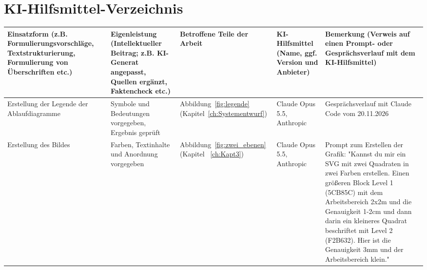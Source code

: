 \documentclass[
	thesis={type=msc}, %
	class=report,%
	ruledheaders=section,%
	accentcolor=1b, %
	marginpar=false,%
	parskip=half-,%
	fontsize=11pt,%
	IMRAD=false, %
]{tudapub}
\begin{document}




%



\cleardoublepage
\ifdocenglish
    \printbibliography[title={Bibliography}]
\else
    \printbibliography[title={Literaturverzeichnis}]
\fi
\cleardoublepage

\chapter*{KI-Hilfsmittel-Verzeichnis}


\begin{longtable}{|p{}|p{}|p{}|p{}|p{}|}
\hline
\rowcolor[HTML]{C0C0C0} 
{\color[HTML]{DEDEDE} } \textbf{Einsatzform} \; (z.B. Formulierungsvorschläge, Textstrukturierung, Formulierung von Überschriften etc.) & {\color[HTML]{DEDEDE} } \textbf{Eigenleistung} (Intellektueller Beitrag; z.B. KI-Generat angepasst, Quellen ergänzt, Faktencheck etc.) & {\color[HTML]{DEDEDE} } \textbf{Betroffene
Teile der Arbeit} & {\color[HTML]{DEDEDE}}\textbf{KI-Hilfsmittel} \; (Name, ggf. Version und Anbieter) & {\color[HTML]{DEDEDE}} \textbf{Bemerkung} \;\; (Verweis auf einen Prompt- oder Gesprächsverlauf mit dem KI-Hilfsmittel)
 \\ \hline
\endfirsthead
\endhead
Erstellung der Legende der Ablaufdiagramme & Symbole und Bedeutungen vorgegeben, Ergebnis geprüft & Abbildung~\ref{fig:legende} (Kapitel~\ref{ch:Systementwurf}) & Claude Opus 5.5, Anthropic & Gesprächsverlauf mit Claude Code vom 20.11.2026 \\ \hline

Erstellung des Bildes & Farben, Textinhalte und Anordnung vorgegeben & Abbildung~\ref{fig:zwei_ebenen} (Kapitel ~\ref{ch:Kapt3}) & Claude Opus 5.5, Anthropic & Prompt zum Erstellen der Grafik: "Kannst du mir ein SVG mit zwei Quadraten in zwei Farben erstellen. Einen größeren Block Level 1 (5CB85C) mit dem Arbeitsbereich 2x2m und die Genauigkeit 1-2cm und dann darin ein kleineres Quadrat beschriftet mit Level 2 (F2B632). Hier ist die Genauigkeit 3mm und der Arbeitsbereich klein."


\end{longtable}   
\end{document}
